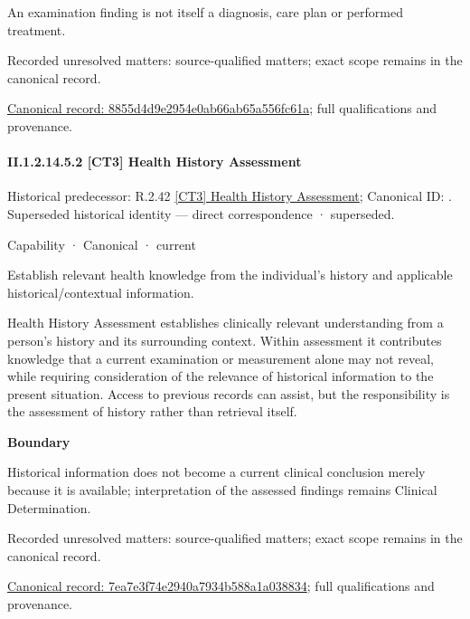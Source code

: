 An examination finding is not itself a diagnosis, care plan or performed treatment.


{\small Recorded unresolved matters: source-qualified matters; exact scope remains in the canonical record.}\par
{\footnotesize \href{../../../../../../../continuum/strategy/capability/8855d4d9e2954e0ab66ab65a556fc61a.md}{Canonical record: 8855d4d9e2954e0ab66ab65a556fc61a}; full qualifications and provenance.}\par
\paragraph*{II.1.2.14.5.2 [CT3] Health History Assessment}
\label{navigation:II.1.2.14.5.2}

{\small Historical predecessor: R.2.42 \hyperref[element:bcaacf446f45443eafd8e21a1fd74ee1]{[CT3] Health History Assessment}; Canonical ID: \texttt{}. Superseded historical identity — direct correspondence · superseded.}\par
\label{element:7ea7e3f74e2940a7934b588a1a038834}
{\small Capability · Canonical · current}\par

Establish relevant health knowledge from the individual’s history and applicable historical/contextual information.



Health History Assessment establishes clinically relevant understanding from a person's history and its surrounding context. Within assessment it contributes knowledge that a current examination or measurement alone may not reveal, while requiring consideration of the relevance of historical information to the present situation. Access to previous records can assist, but the responsibility is the assessment of history rather than retrieval itself.



\textbf{Boundary}



Historical information does not become a current clinical conclusion merely because it is available; interpretation of the assessed findings remains Clinical Determination.


{\small Recorded unresolved matters: source-qualified matters; exact scope remains in the canonical record.}\par
{\footnotesize \href{../../../../../../../continuum/strategy/capability/7ea7e3f74e2940a7934b588a1a038834.md}{Canonical record: 7ea7e3f74e2940a7934b588a1a038834}; full qualifications and provenance.}\par
